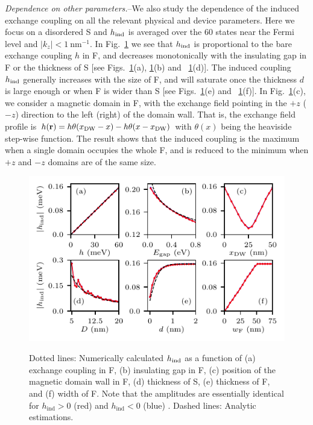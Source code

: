 \documentclass[aps,prl,twocolumn,superscriptaddress,showpacs,longbibliography]{revtex4-1}
\begin{document}
\emph{Dependence on other parameters.}--We also study the dependence of the induced exchange coupling on all the relevant physical and device parameters.
Here we focus on a disordered S and $h_{\rm{ind}}$ is averaged over the 60 states near the Fermi level and $|k_z| < 1~\text{nm}^{-1}$.
In Fig.~\ref{fig:Fig_5} we see that $h_{\rm{ind}}$ is proportional to the bare exchange coupling $h$ in F, and decreases monotonically with the insulating gap in F or the thickness of S [see Figs.~\ref{fig:Fig_5}(a), \ref{fig:Fig_5}(b) and ~\ref{fig:Fig_5}(d)].
The induced coupling $h_{\rm{ind}}$ generally increases with the size of F, and will saturate once the thickness $d$ is large enough or when F is wider than S [see Figs.~\ref{fig:Fig_5}(e) and ~\ref{fig:Fig_5}(f)].
In Fig.~\ref{fig:Fig_5}(c), we consider a magnetic domain in F, with the exchange field pointing in the $+z$ ($-z$) direction to the left (right) of the domain wall. 
That is, the exchange field profile is $h(\bold{r}) = h\theta(x_{\rm{DW}} - x) - h\theta(x - x_{\rm{DW}})$ with $\theta(x)$ being the heaviside step-wise function.
The result shows that the induced coupling is the maximum when a single domain occupies the whole F, and is reduced to the minimum when $+z$ and $-z$ domains are of the same size.


\begin{figure}
\centering
{\includegraphics[width = \linewidth]{Fig_5.pdf}}
\caption{Dotted lines: Numerically calculated $h_{\rm{ind}}$ as a function of (a) exchange coupling in F, (b) insulating gap in F, (c) position of the magnetic domain wall in F, (d) thickness of S, (e) thickness of F, and (f) width of F. Note that the amplitudes are essentially identical for $h_{\text{ind}} > 0$ (red) and $h_{\text{ind}} < 0$ (blue) .
Dashed lines: Analytic estimations. }
\label{fig:Fig_5}
\end{figure}
\end{document}
